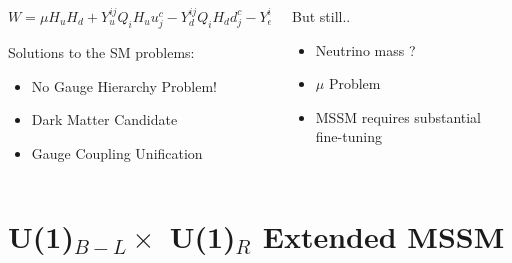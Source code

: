 \documentclass[hyperref={bookmarks=false},aspectratio=169]{beamer}
\begin{document}
\begin{frame}
{	\begin{minipage}[b][0.5\textheight][t]{\textwidth}
		\vspace{0.05in}
		\begin{columns}
			\begin{column}{0.5\textwidth}
				\color{black}
				\centering
				\vspace{-0.5cm}
	            {\small  \begin{equation*}
					W=\mu H_{u}H_{d}+Y_{u}^{ij}Q_{i}H_{u}u^{c}_{j}-Y_{d}^{ij}Q_{i}H_{d}d^{c}_{j}-Y_{e}^{ij}L_{i}H_{d}e^{c}_{j} 
					\end{equation*}}
				\pause
				\centering
				\vspace{-0.45cm}
				\begin{alertblock}{Solutions to the SM problems:}
					\begin{itemize}
						\item No Gauge Hierarchy Problem!
						\item Dark Matter Candidate
						\item Gauge Coupling Unification
				    \end{itemize}
				\end{alertblock}
			\end{column}
			\pause
			\begin{column}{0.5\textwidth}
				\color{red}
				\centering
				\begin{alertblock}{ But still..}
					 \begin{itemize}
					 	\centering
						\item Neutrino mass ?
						\item $\mu$ Problem
						\item MSSM requires substantial fine-tuning
					\end{itemize}
				\end{alertblock}
				
			\end{column}
		\end{columns}
	\end{minipage}
}

\end{frame}






\section{U(1)$_{B-L} \times$ U(1)$_{R}$ Extended MSSM}
\end{document}
